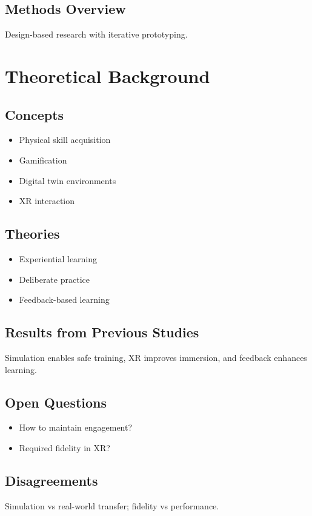 \documentclass[12pt]{article}
\begin{document}
\subsection{Methods Overview}
Design-based research with iterative prototyping.

\newpage
\section{Theoretical Background}

\subsection{Concepts}
\begin{itemize}
    \item Physical skill acquisition
    \item Gamification
    \item Digital twin environments
    \item XR interaction
\end{itemize}

\subsection{Theories}
\begin{itemize}
    \item Experiential learning
    \item Deliberate practice
    \item Feedback-based learning
\end{itemize}

\subsection{Results from Previous Studies}
Simulation enables safe training, XR improves immersion, and feedback enhances learning.

\subsection{Open Questions}
\begin{itemize}
    \item How to maintain engagement?
    \item Required fidelity in XR?
\end{itemize}

\subsection{Disagreements}
Simulation vs real-world transfer; fidelity vs performance.
\end{document}
